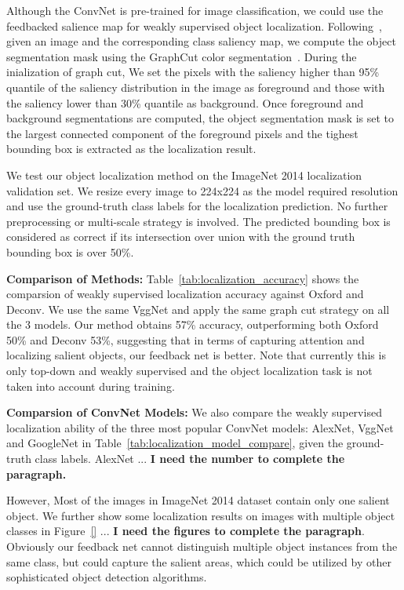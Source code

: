 Although the ConvNet is pre-trained for image classification, we could use the feedbacked salience map for weakly supervised object localization. Following~\cite{simonyan2013deep}, given an image and the corresponding class saliency map, we compute the object segmentation mask using the GraphCut color segmentation~\cite{yuri2001interactive}. During the inialization of graph cut, We set the pixels with the saliency higher than 95\% quantile of the saliency distribution in the image as foreground and those with the saliency lower than 30\% quantile as background. Once foreground and background segmentations are computed, the object segmentation mask is set to the largest connected component of the foreground pixels and the tighest bounding box is extracted as the localization result.

We test our object localization method on the ImageNet 2014 localization validation set. We resize every image to 224x224 as the model required resolution and use the ground-truth class labels for the localization prediction. No further preprocessing or multi-scale strategy is involved. The predicted bounding box is considered as correct if its intersection over union with the ground truth bounding box is over 50\%. 

\textbf{Comparison of Methods:} Table~\ref{tab:localization_accuracy} shows the comparsion of weakly supervised localization accuracy against Oxford and Deconv. We use the same VggNet and apply the same graph cut strategy on all the 3 models. Our method obtains 57\% accuracy, outperforming both Oxford 50\% and Deconv 53\%, suggesting that in terms of capturing attention and localizing salient objects, our feedback net is better. Note that currently this is only top-down and weakly supervised and the object localization task is not taken into account during training.

\textbf{Comparsion of ConvNet Models:} We also compare the weakly supervised localization ability of the three most popular ConvNet models: AlexNet, VggNet and GoogleNet in Table~\ref{tab:localization_model_compare}, given the ground-truth class labels. AlexNet ... \textbf{\color{red} I need the number to complete the paragraph. } 

However, Most of the images in ImageNet 2014 dataset contain only one salient object. We further show some localization results on images with multiple object classes in Figure~\ref{} ... \textbf{\color{red} I need the figures to complete the paragraph}. Obviously our feedback net cannot distinguish multiple object instances from the same class, but could capture the salient areas, which could be utilized by other sophisticated object detection algorithms. 

